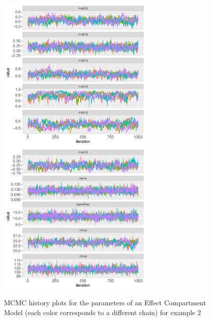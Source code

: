 \documentclass[11pt]{amsart}
\begin{document}
\begin{figure}[!htb]
\includegraphics[width=3.0in,trim=0in 0in 0 0in]{graphics/effCptModelTorsten/effCptModelTorstenPlots004.pdf}
\includegraphics[width=3.0in,trim=0in 0in 0 0in]{graphics/effCptModelTorsten/effCptModelTorstenPlots005.pdf}
\caption{{MCMC history plots for the parameters of an Effect Compartment Model (each color corresponds to a different chain) for example 2}}
\label{effCptModelMCMC}
\end{figure}
\end{document}
